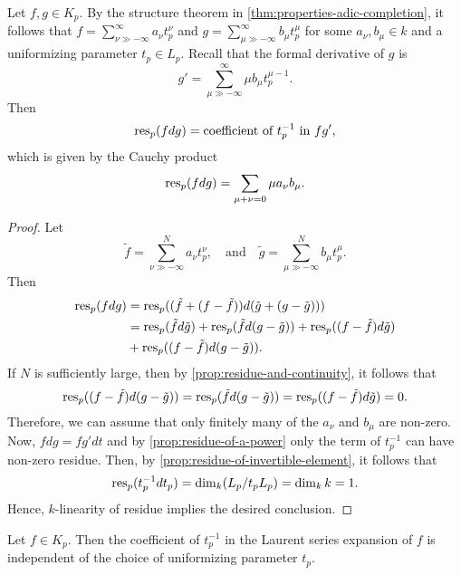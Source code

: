 \begin{theorem}\label{thm:resiude-coincides-with-coefficient}
	Let $f,g \in K_{p}$. By the structure theorem in \cref{thm:properties-adic-completion}, it follows that $f = \sum_{\nu \gg -\infty}^{\infty} a_{\nu}t_{p}^{\nu}$ and $g = \sum_{\mu \gg -\infty}^{\infty} b_{\mu}t_{p}^{\mu}$ for some $a_{\nu},b_{\mu} \in k$ and a uniformizing parameter $t_{p}\in L_{p} $. Recall that the formal derivative of $g$ is
	\[
		g' = \sum_{\mu \gg -\infty}^{\infty} \mu b_{\mu}t_{p}^{\mu -1}.
	\]
	Then
	\[
		\operatorname{res}_{p}(fdg) = \text{coefficient of }t_{p}^{-1}\text{ in } fg',
	\]
	which is given by the Cauchy product
	\[
		\operatorname{res}_{p}(fdg) = \sum_{\mu + \nu = 0}\mu a_\nu{}b_{\mu}.
	\]
\end{theorem}
\begin{proof}
	Let
	\[
		\tilde{f} = \sum_{\nu\gg-\infty}^{N} a_{\nu}t_{p}^{\nu},\quad\text{and}\quad\tilde{g} = \sum_{\mu\gg-\infty}^{N} b_{\mu}t_{p}^{\mu}.
	\]
	Then
	\begin{align*}
		\operatorname{res}_{p}(fdg) &= \operatorname{res}_{p}( (\tilde{f} + (f - \tilde{f}))d(\tilde{g} + (g - \tilde{g}))) \\
		&= \operatorname{res}_{p}(\tilde{f}d\tilde{g}) + \operatorname{res}_{p}(\tilde{f}d(g - \tilde{g})) + \operatorname{res}_{p}((f-\tilde{f}) d\tilde{g}) \\ &+ \operatorname{res}_{p}( (f - \tilde{f})d(g-\tilde{g})).
	\end{align*}
	If $N$ is sufficiently large, then by \cref{prop:residue-and-continuity}, it follows that 
	\[
		\operatorname{res}_{p}( (f - \tilde{f})d(g-\tilde{g})) = \operatorname{res}_{p}(\tilde{f}d(g - \tilde{g})) = \operatorname{res}_{p}((f-\tilde{f}) d\tilde{g}) = 0.
	\]
	Therefore, we can assume that only finitely many of the $a_{\nu}$ and $b_{\mu}$ are non-zero. Now, $fdg = f g' dt$ and by \cref{prop:residue-of-a-power} only the term of $t_{p}^{-1}$ can have non-zero residue. Then, by \cref{prop:residue-of-invertible-element}, it follows that
	\[
		\operatorname{res}_{p}(t_{p}^{-1}dt_{p}) = \dim_{k}(L_{p}/t_{p}L_{p}) = \dim_{k}k = 1. 	
	\]
	Hence, $k$-linearity of residue implies the desired conclusion.
\end{proof}
\begin{corollary}\label{cor:invriance-of-residue-coefficient}
	Let $f\in K_{p}$. Then the coefficient of $t_{p}^{-1}$ in the Laurent series expansion of $f$ is independent of the choice of uniformizing parameter $t_{p}$.	
\end{corollary}
